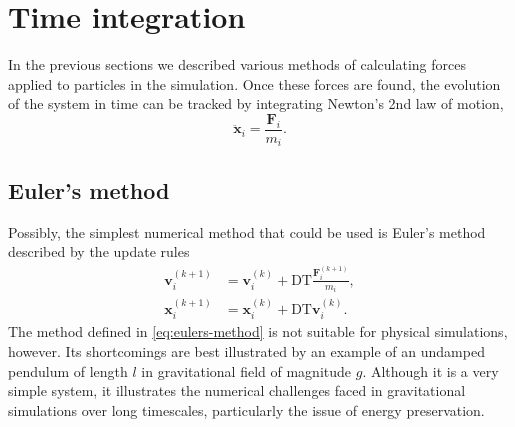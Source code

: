 \section{Time integration}
In the previous sections we described various methods of calculating forces applied to particles in the simulation.
Once these forces are found, the evolution of the system in time can be tracked by integrating Newton's 2nd law of motion,
\begin{equation}\label{eq:newtons-second}
    \ddot{\mathbf{x}}_i = \frac{\mathbf{F}_i}{m_i}.
\end{equation}

\subsection{Euler's method}
Possibly, the simplest numerical method that could be used is Euler's method described by the update rules
\begin{equation}\label{eq:eulers-method}
    \begin{aligned}
        \mathbf{v}_i^{(k+1)} & = \mathbf{v}_i^{(k)} + \textrm{DT} \frac{\mathbf{F}^{(k+1)}_i}{m_i}, \\
        \mathbf{x}_i^{(k+1)} & = \mathbf{x}_i^{(k)} + \textrm{DT} \mathbf{v}_i^{(k)}.
    \end{aligned}
\end{equation}
The method defined in \autoref{eq:eulers-method} is not suitable for physical simulations, however.
Its shortcomings are best illustrated by an example of an undamped pendulum of length $l$ in gravitational field of magnitude $g$.
Although it is a very simple system, it illustrates the numerical challenges faced in gravitational simulations over long timescales, particularly the issue of energy preservation.

